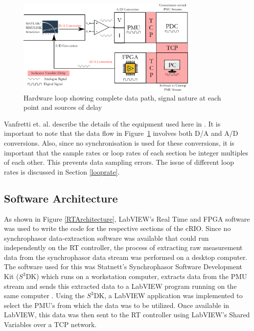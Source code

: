 \documentclass[journal]{IEEEtran}
\begin{document}
\begin{figure}[htpb]
\centering
\includegraphics[width=3.5in]{DataFlow.png} 
\caption{Hardware loop showing complete data path, signal nature at each point and sources of delay}
\label{Hardware_Outline}
\vspace{-1em}
\end{figure}

Vanfretti et. al. describe the details of the equipment used here in \cite{PhasorPODImplement}. It is important to note that the data flow in Figure~\ref{Hardware_Outline} involves both D/A and A/D conversions. Also, since no synchronisation is used for these conversions, it is important that the sample rates or loop rates of each section be integer multiples of each other. This prevents data sampling errors. The issue of different loop rates is discussed in Section \ref{looprate}.


\subsection{Software Architecture}

As shown in Figure \ref{RTArchitecture}, LabVIEW's Real Time and FPGA software was used to write the code for the respective sections of the cRIO. Since no synchrophasor data-extraction software was available that could run independently on the RT controller, the process of extracting raw measurement data from the synchrophasor data stream was performed on a desktop computer. The software used for this was Statnett\rq{s} Synchrophasor Software Development Kit ($S^{3}$DK) \cite{SDK} which runs on a workstation computer, extracts data from the PMU stream and sends this extracted data to a LabVIEW program running on the same computer \cite{SDK}. Using the $S^{3}$DK, a LabVIEW application was implemented to select the PMU\rq{s} from which the data was to be utilized. Once available in LabVIEW, this data was then sent to the RT controller using LabVIEW\rq{s} Shared Variables \cite{LabViewManuals} over a TCP network.
\end{document}
